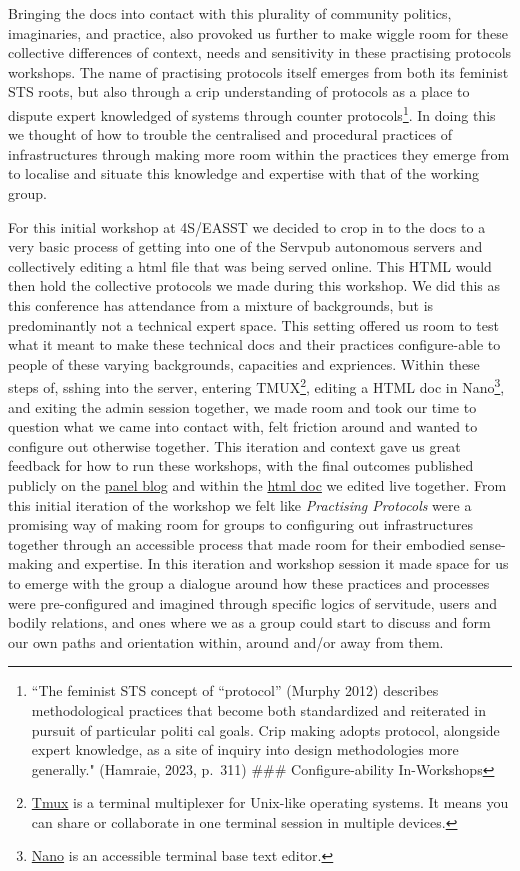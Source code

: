 Bringing the docs into contact with this plurality of community
politics, imaginaries, and practice, also provoked us further to make
wiggle room for these collective differences of context, needs and
sensitivity in these practising protocols workshops. The name of
practising protocols itself emerges from both its feminist STS roots,
but also through a crip understanding of protocols as a place to dispute
expert knowledged of systems through counter protocols\footnote{``The
  feminist STS concept of ``protocol'' (Murphy 2012) describes
  methodological practices that become both standardized and reiterated
  in pursuit of particular politi cal goals. Crip making adopts
  protocol, alongside expert knowledge, as a site of inquiry into design
  methodologies more generally." (Hamraie, 2023, p.~311) \#\#\#
  Configure-ability In-Workshops}. In doing this we thought of how to
trouble the centralised and procedural practices of infrastructures
through making more room within the practices they emerge from to
localise and situate this knowledge and expertise with that of the
working group.

For this initial workshop at 4S/EASST we decided to crop in to the docs
to a very basic process of getting into one of the Servpub autonomous
servers and collectively editing a html file that was being served
online. This HTML would then hold the collective protocols we made
during this workshop. We did this as this conference has attendance from
a mixture of backgrounds, but is predominantly not a technical expert
space. This setting offered us room to test what it meant to make these
technical docs and their practices configure-able to people of these
varying backgrounds, capacities and expriences. Within these steps of,
sshing into the server, entering TMUX\footnote{\href{https://github.com/tmux/tmux/wiki}{Tmux}
  is a terminal multiplexer for Unix-like operating systems. It means
  you can share or collaborate in one terminal session in multiple
  devices.}, editing a HTML doc in Nano\footnote{\href{https://www.nano-editor.org/}{Nano}
  is an accessible terminal base text editor.}, and exiting the admin
session together, we made room and took our time to question what we
came into contact with, felt friction around and wanted to configure out
otherwise together. This iteration and context gave us great feedback
for how to run these workshops, with the final outcomes published
publicly on the
\href{https://ci.servpub.net/in-grid/collective-infrastructures}{panel
blog} and within the \href{https://servpub.net/ci_protocols.html}{html
doc} we edited live together. From this initial iteration of the
workshop we felt like \emph{Practising Protocols} were a promising way
of making room for groups to configuring out infrastructures together
through an accessible process that made room for their embodied
sense-making and expertise. In this iteration and workshop session it
made space for us to emerge with the group a dialogue around how these
practices and processes were pre-configured and imagined through
specific logics of servitude, users and bodily relations, and ones where
we as a group could start to discuss and form our own paths and
orientation within, around and/or away from them.

